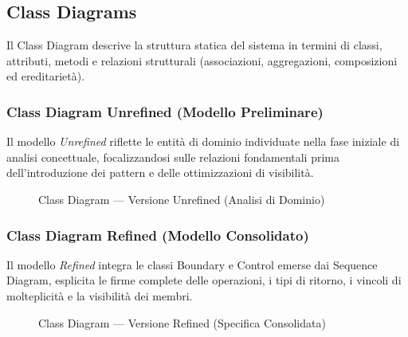 \newpage
\subsection{Class Diagrams}
Il Class Diagram descrive la struttura statica del sistema in termini di classi, attributi, metodi e relazioni strutturali (associazioni, aggregazioni, composizioni ed ereditarietà).

\subsubsection{Class Diagram Unrefined (Modello Preliminare)}
Il modello \textit{Unrefined} riflette le entità di dominio individuate nella fase iniziale di analisi concettuale, focalizzandosi sulle relazioni fondamentali prima dell'introduzione dei pattern e delle ottimizzazioni di visibilità.

\begin{figure}[H]
    \centering
    \caption{Class Diagram --- Versione Unrefined (Analisi di Dominio)}
    \label{fig:class_unrefined}
\end{figure}

\subsubsection{Class Diagram Refined (Modello Consolidato)}
Il modello \textit{Refined} integra le classi Boundary e Control emerse dai Sequence Diagram, esplicita le firme complete delle operazioni, i tipi di ritorno, i vincoli di molteplicità e la visibilità dei membri.

\begin{figure}[H]
    \centering
    \caption{Class Diagram --- Versione Refined (Specifica Consolidata)}
    \label{fig:class_refined}
\end{figure}
